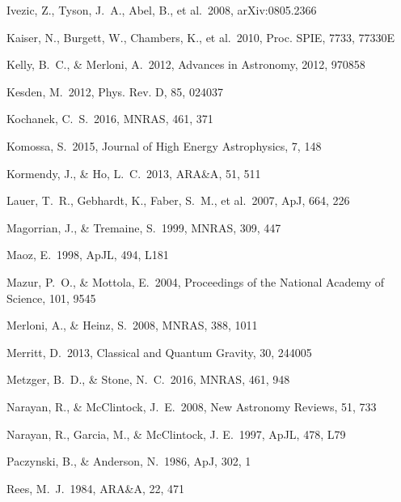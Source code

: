 \documentclass[useAMS,usenatbib]{mn2e}
\def\apj{{ ApJ}}
\def\apjl{{ ApJL}}
\def\mnras{{ MNRAS}}
\def\araa{{ ARA\&A}}
\def\prd{{ Phys. Rev. D}}
\def\procspie{{Proc. SPIE}}
\def\nar{{New Astronomy Reviews}}
\begin{document}
\begin{thebibliography}{}
 Ivezic, Z., Tyson,
  J.~A., Abel, B., et al.\ 2008, arXiv:0805.2366 

 Kaiser, N.,
  Burgett, W., Chambers, K., et al.\ 2010, \procspie, 7733, 77330E  

 Kelly, B.~C., \&
  Merloni, A.\ 2012, Advances in Astronomy, 2012, 970858  

 Kesden, M.\ 2012, \prd,
  85, 024037 

 Kochanek, C.~S.\ 2016,
  \mnras, 461, 371

 Komossa, S.\ 2015,
  Journal of High Energy Astrophysics, 7, 148 

 Kormendy, J., \& Ho, L.~C.\ 2013,
\araa, 51, 511 

 Lauer, T.~R.,
  Gebhardt, K., Faber, S.~M., et al.\ 2007, \apj, 664, 226 

 Magorrian, J., \& Tremaine,
S.\ 1999, \mnras, 309, 447  

 Maoz, E.\ 1998, \apjl, 494,
  L181 

 Mazur, P.~O., \&
  Mottola, E.\ 2004, Proceedings of the National Academy of Science,
  101, 9545 

 Merloni, A., \&
  Heinz, S.\ 2008, \mnras, 388, 1011 

 Merritt, D.\ 2013,
  Classical and Quantum Gravity, 30, 244005 

 Metzger, B.~D., \& Stone, N.~C.\ 2016, \mnras, 461, 948

 Narayan, R., \& McClintock,
J.~E.\ 2008, \nar, 51, 733  

 Narayan, R., Garcia, M., \&
McClintock, J. E.\ 1997, \apjl, 478, L79

 Paczynski,
  B., \& Anderson, N.\ 1986, \apj, 302, 1 

 Rees, M.~J.\ 1984, \araa,
  22, 471 


\end{thebibliography}
\end{document}
